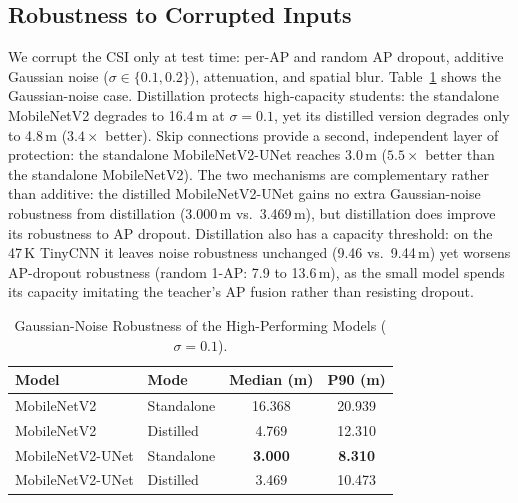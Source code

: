 \documentclass[conference,a4paper]{IEEEtran}
\begin{document}
\subsection{Robustness to Corrupted Inputs}
\label{sec:robust}
We corrupt the CSI only at test time: per-AP and random AP dropout, additive Gaussian noise ($\sigma \in \{0.1, 0.2\}$), attenuation, and spatial blur. Table~\ref{tab:robust} shows the Gaussian-noise case. Distillation protects high-capacity students: the standalone MobileNetV2 degrades to 16.4\,m at $\sigma = 0.1$, yet its distilled version degrades only to 4.8\,m ($3.4\times$ better). Skip connections provide a second, independent layer of protection: the standalone MobileNetV2-UNet reaches 3.0\,m ($5.5\times$ better than the standalone MobileNetV2). The two mechanisms are complementary rather than additive: the distilled MobileNetV2-UNet gains no extra Gaussian-noise robustness from distillation (3.000\,m vs.\ 3.469\,m), but distillation does improve its robustness to AP dropout. Distillation also has a capacity threshold: on the 47\,K TinyCNN it leaves noise robustness unchanged (9.46 vs.\ 9.44\,m) yet worsens AP-dropout robustness (random 1-AP: 7.9 to 13.6\,m), as the small model spends its capacity imitating the teacher's AP fusion rather than resisting dropout.

\begin{table}[t]
\caption{Gaussian-Noise Robustness of the High-Performing Models ($\sigma = 0.1$).}
\label{tab:robust}
\centering
\scriptsize
\setlength{\tabcolsep}{6pt}
\begin{tabular}{@{}llcc@{}}
\toprule
\textbf{Model} & \textbf{Mode} & \textbf{Median (m)} & \textbf{P90 (m)} \\
\midrule
MobileNetV2      & Standalone & 16.368 & 20.939 \\
MobileNetV2      & Distilled  & 4.769  & 12.310 \\
MobileNetV2-UNet & Standalone & \textbf{3.000} & \textbf{8.310} \\
MobileNetV2-UNet & Distilled  & 3.469  & 10.473 \\
\bottomrule
\end{tabular}
\end{table}
\end{document}
